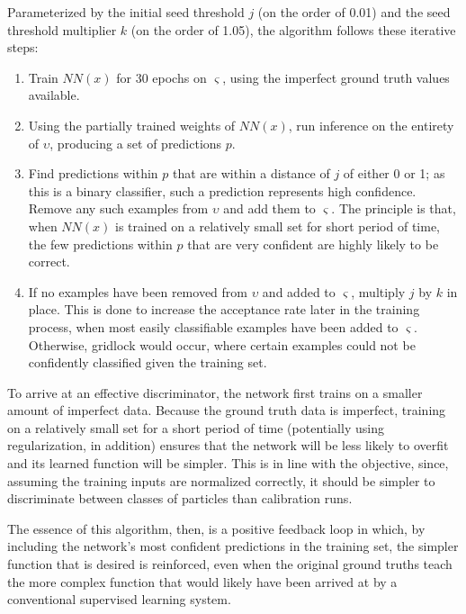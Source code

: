 \documentclass[10pt]{article}
\begin{document}
Parameterized by the initial seed threshold $j$ (on the order of 0.01) and the seed threshold multiplier $k$ (on the order of 1.05), the algorithm follows these iterative steps:

\begin{enumerate}
    \item Train $NN(x)$ for 30 epochs on $\varsigma$, using the imperfect ground truth values available.
    \item Using the partially trained weights of $NN(x)$, run inference on the entirety of $\upsilon$, producing a set of predictions $p$.
    \item Find predictions within $p$ that are within a distance of $j$ of either 0 or 1; as this is a binary classifier, such a prediction represents high confidence. Remove any such examples from $\upsilon$ and add them to $\varsigma$. The principle is that, when $NN(x)$ is trained on a relatively small set for short period of time, the few predictions within $p$ that are very confident are highly likely to be correct.
    \item If no examples have been removed from $\upsilon$ and added to $\varsigma$, multiply $j$ by $k$ in place. This is done to increase the acceptance rate later in the training process, when most easily classifiable examples have been added to $\varsigma$. Otherwise, gridlock would occur, where certain examples could not be confidently classified given the training set.
\end{enumerate}

To arrive at an effective discriminator, the network first trains on a smaller amount of imperfect data. Because the ground truth data is imperfect, training on a relatively small set for a short period of time (potentially using regularization, in addition) ensures that the network will be less likely to overfit and its learned function will be simpler. This is in line with the objective, since, assuming the training inputs are normalized correctly, it should be simpler to discriminate between classes of particles than calibration runs.

The essence of this algorithm, then, is a positive feedback loop in which, by including the network's most confident predictions in the training set, the simpler function that is desired is reinforced, even when the original ground truths teach the more complex function that would likely have been arrived at by a conventional supervised learning system.

\printbibliography
\end{document}
